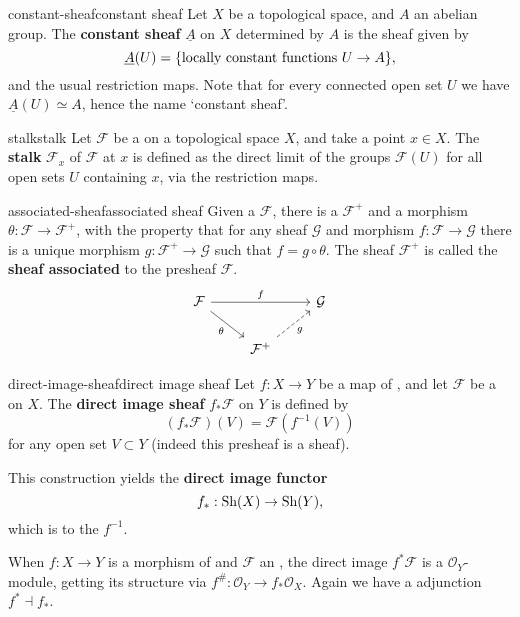 \begin{topic}{constant-sheaf}{constant sheaf}
    Let $X$ be a topological space, and $A$ an abelian group. The \textbf{constant sheaf} $\underline{A}$ on $X$ determined by $A$ is the sheaf given by
    \[ \underline{A}(U) = \{ \textup{locally constant functions } U \to A \} , \]
    and the usual restriction maps. Note that for every connected open set $U$ we have $\underline{A}(U) \simeq A$, hence the name `constant sheaf'.
\end{topic}

\begin{topic}{stalk}{stalk}
    Let $\mathcal{F}$ be a  on a topological space $X$, and take a point $x \in X$. The \textbf{stalk} $\mathcal{F}_x$ of $\mathcal{F}$ at $x$ is defined as the direct limit of the groups $\mathcal{F}(U)$ for all open sets $U$ containing $x$, via the restriction maps.
\end{topic}

\begin{topic}{associated-sheaf}{associated sheaf}
    Given a  $\mathcal{F}$, there is a  $\mathcal{F}^+$ and a morphism $\theta : \mathcal{F} \to \mathcal{F}^+$, with the property that for any sheaf $\mathcal{G}$ and morphism $f : \mathcal{F} \to \mathcal{G}$ there is a unique morphism $g : \mathcal{F}^+ \to \mathcal{G}$ such that $f = g \circ \theta$. The sheaf $\mathcal{F}^+$ is called the \textbf{sheaf associated} to the presheaf $\mathcal{F}$.
    \[ \begin{tikzcd} \mathcal{F} \arrow{rr}{f} \arrow[swap]{dr}{\theta} && \mathcal{G} \\ & \mathcal{F}^+ \arrow[swap,dashed]{ur}{g} & \end{tikzcd} \]
\end{topic}

\begin{topic}{direct-image-sheaf}{direct image sheaf}
    Let $f : X \to Y$ be a map of , and let $\mathcal{F}$ be a  on $X$. The \textbf{direct image sheaf} $f_* \mathcal{F}$ on $Y$ is defined by
    \[ (f_* \mathcal{F})(V) = \mathcal{F}(f^{-1}(V)) \]
    for any open set $V \subset Y$ (indeed this presheaf is a sheaf).
    
    This construction yields the \textbf{direct image functor}
    \[ f_* : \textup{Sh}(X) \to \textup{Sh}(Y) , \]
    which is  to the  $f^{-1}$.
    
    When $f : X \to Y$ is a morphism of  and $\mathcal{F}$ an , the direct image $f^* \mathcal{F}$ is a $\mathcal{O}_Y$-module, getting its structure via $f^\# : \mathcal{O}_Y \to f_* \mathcal{O}_X$. Again we have a adjunction $f^* \dashv f_*$.
\end{topic}


